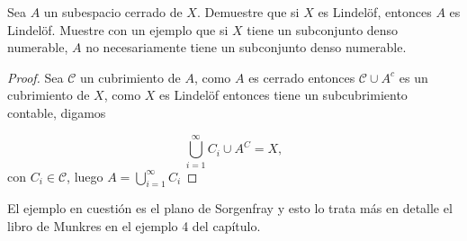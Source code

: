 
\item Sea $A$ un subespacio cerrado de $X$. Demuestre que si $X$ es Lindelöf, entonces $A$ es Lindelöf.  
Muestre con un ejemplo que si $X$ tiene un subconjunto denso numerable, $A$ no necesariamente tiene un subconjunto denso numerable.

\begin{proof}
    Sea $\mathcal{C}$ un cubrimiento de $A$, como $A$ es cerrado entonces $\mathcal{C}\cup A^c$ es un cubrimiento  de $X$, como $X$ es Lindelöf entonces tiene un subcubrimiento contable, digamos 

    $$\bigcup_{i=1}^{\infty}C_i\cup A^{C}=X, 
        $$
     con $C_i\in \mathcal{C}$, luego $A=\bigcup_{i=1}^{\infty}C_i$
\end{proof}

El ejemplo en cuestión es el plano de Sorgenfray y esto lo trata más en detalle el libro de Munkres en el ejemplo 4 del capítulo.